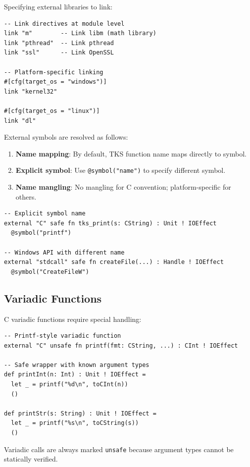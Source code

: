\begin{definition}
\label{def:link-spec}
Specifying external libraries to link:
\begin{verbatim}
-- Link directives at module level
link "m"        -- Link libm (math library)
link "pthread"  -- Link pthread
link "ssl"      -- Link OpenSSL

-- Platform-specific linking
#[cfg(target_os = "windows")]
link "kernel32"

#[cfg(target_os = "linux")]
link "dl"
\end{verbatim}
\end{definition}

\begin{definition}
\label{def:symbol-resolution}
External symbols are resolved as follows:
\begin{enumerate}
  \item \textbf{Name mapping}: By default, TKS function name maps directly to symbol.
  \item \textbf{Explicit symbol}: Use \texttt{@symbol("name")} to specify different symbol.
  \item \textbf{Name mangling}: No mangling for C convention; platform-specific for others.
\end{enumerate}
\begin{verbatim}
-- Explicit symbol name
external "C" safe fn tks_print(s: CString) : Unit ! IOEffect
  @symbol("printf")

-- Windows API with different name
external "stdcall" safe fn createFile(...) : Handle ! IOEffect
  @symbol("CreateFileW")
\end{verbatim}
\end{definition}

\subsection{Variadic Functions}
\label{subsec:variadic}

\begin{definition}
\label{def:variadic-extern}
C variadic functions require special handling:
\begin{verbatim}
-- Printf-style variadic function
external "C" unsafe fn printf(fmt: CString, ...) : CInt ! IOEffect

-- Safe wrapper with known argument types
def printInt(n: Int) : Unit ! IOEffect =
  let _ = printf("%d\n", toCInt(n))
  ()

def printStr(s: String) : Unit ! IOEffect =
  let _ = printf("%s\n", toCString(s))
  ()
\end{verbatim}
Variadic calls are always marked \texttt{unsafe} because argument types cannot be statically verified.
\end{definition}

